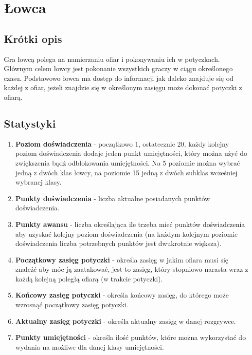 \documentclass[a4paper,11pt,notitlepage]{article}
\begin{document}
\section{Łowca}
\subsection{Krótki opis}
Gra łowcą polega na namierzaniu ofiar i pokonywaniu ich w potyczkach. Głównym celem łowcy jest pokonanie wszystkich graczy w ciągu określonego czasu. Podstawowo łowca ma dostęp do informacji jak daleko znajduje się od każdej z ofiar, jeżeli znajdzie się w określonym zasięgu może dokonać potyczki z ofiarą.

\subsection{Statystyki}
\begin{enumerate}
\item
	\textbf{Poziom doświadczenia} - początkowo 1, ostatecznie 20, każdy kolejny poziom doświadczenia dodaje jeden punkt umiejętności, który można użyć do zwiększenia bądź odblokowania umiejętności. Na 5 poziomie można wybrać jedną z dwóch klas łowcy, na poziomie 15 jedną z dwóch subklas wcześniej wybranej klasy.

\item
	\textbf{Punkty doświadczenia} - liczba aktualne posiadanych punktów doświadczenia.
	
\item
	\textbf{Punkty awansu} - liczba określająca ile trzeba mieć punktów doświadczenia aby uzyskać kolejny poziom doświadczenia (na każdym kolejnym poziomie doświadczenia liczba potrzebnych punktów jest dwukrotnie większa).	
	
\item
	\textbf{Początkowy zasięg potyczki} - określa zasięg w jakim ofiara musi się znaleźć aby móc ją zaatakować, jest to zasięg, który stopniowo narasta wraz z każdą kolejną poległą ofiarą (w trakcie potyczki).
	
\item
	\textbf{Końcowy zasięg potyczki} - określa końcowy zasięg, do którego może wzrosnąć początkowy zasięg potyczki.
	
\item
	\textbf{Aktualny zasięg potyczki} - określa aktualny zasięg w danej rozgrywce.
	
\item 
	\textbf{Punkty umiejętności} - określa ilość punktów, które można wykorzystać do wydania na możliwe dla danej klasy umiejętności.
	
\end{enumerate}
\end{document}
